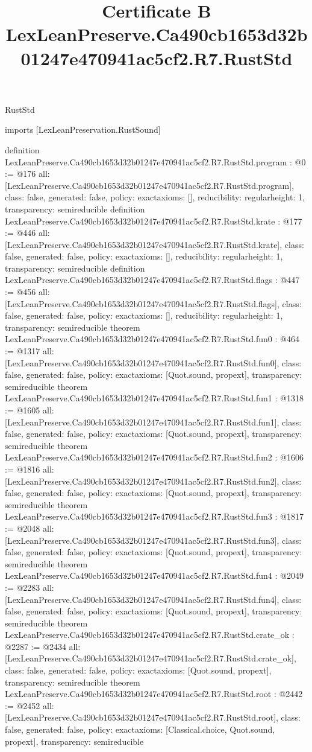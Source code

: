 \begin{lexlean}{RustStd}
\title{Certificate B LexLeanPreserve.Ca490cb1653d32b01247e470941ac5cf2.R7.RustStd}
\begin{coremodule}
imports [LexLeanPreservation.RustSound]

definition LexLeanPreserve.Ca490cb1653d32b01247e470941ac5cf2.R7.RustStd.program : @0 := @176 {
  all: [LexLeanPreserve.Ca490cb1653d32b01247e470941ac5cf2.R7.RustStd.program],
  class: false,
  generated: false,
  policy: exact{axioms: []},
  reducibility: regular{height: 1},
  transparency: semireducible
}
definition LexLeanPreserve.Ca490cb1653d32b01247e470941ac5cf2.R7.RustStd.krate : @177 := @446 {
  all: [LexLeanPreserve.Ca490cb1653d32b01247e470941ac5cf2.R7.RustStd.krate],
  class: false,
  generated: false,
  policy: exact{axioms: []},
  reducibility: regular{height: 1},
  transparency: semireducible
}
definition LexLeanPreserve.Ca490cb1653d32b01247e470941ac5cf2.R7.RustStd.flags : @447 := @456 {
  all: [LexLeanPreserve.Ca490cb1653d32b01247e470941ac5cf2.R7.RustStd.flags],
  class: false,
  generated: false,
  policy: exact{axioms: []},
  reducibility: regular{height: 1},
  transparency: semireducible
}
theorem LexLeanPreserve.Ca490cb1653d32b01247e470941ac5cf2.R7.RustStd.fun0 : @464 := @1317 {
  all: [LexLeanPreserve.Ca490cb1653d32b01247e470941ac5cf2.R7.RustStd.fun0],
  class: false,
  generated: false,
  policy: exact{axioms: [Quot.sound, propext]},
  transparency: semireducible
}
theorem LexLeanPreserve.Ca490cb1653d32b01247e470941ac5cf2.R7.RustStd.fun1 : @1318 := @1605 {
  all: [LexLeanPreserve.Ca490cb1653d32b01247e470941ac5cf2.R7.RustStd.fun1],
  class: false,
  generated: false,
  policy: exact{axioms: [Quot.sound, propext]},
  transparency: semireducible
}
theorem LexLeanPreserve.Ca490cb1653d32b01247e470941ac5cf2.R7.RustStd.fun2 : @1606 := @1816 {
  all: [LexLeanPreserve.Ca490cb1653d32b01247e470941ac5cf2.R7.RustStd.fun2],
  class: false,
  generated: false,
  policy: exact{axioms: [Quot.sound, propext]},
  transparency: semireducible
}
theorem LexLeanPreserve.Ca490cb1653d32b01247e470941ac5cf2.R7.RustStd.fun3 : @1817 := @2048 {
  all: [LexLeanPreserve.Ca490cb1653d32b01247e470941ac5cf2.R7.RustStd.fun3],
  class: false,
  generated: false,
  policy: exact{axioms: [Quot.sound, propext]},
  transparency: semireducible
}
theorem LexLeanPreserve.Ca490cb1653d32b01247e470941ac5cf2.R7.RustStd.fun4 : @2049 := @2283 {
  all: [LexLeanPreserve.Ca490cb1653d32b01247e470941ac5cf2.R7.RustStd.fun4],
  class: false,
  generated: false,
  policy: exact{axioms: [Quot.sound, propext]},
  transparency: semireducible
}
theorem LexLeanPreserve.Ca490cb1653d32b01247e470941ac5cf2.R7.RustStd.crate_ok : @2287 := @2434 {
  all: [LexLeanPreserve.Ca490cb1653d32b01247e470941ac5cf2.R7.RustStd.crate_ok],
  class: false,
  generated: false,
  policy: exact{axioms: [Quot.sound, propext]},
  transparency: semireducible
}
theorem LexLeanPreserve.Ca490cb1653d32b01247e470941ac5cf2.R7.RustStd.root : @2442 := @2452 {
  all: [LexLeanPreserve.Ca490cb1653d32b01247e470941ac5cf2.R7.RustStd.root],
  class: false,
  generated: false,
  policy: exact{axioms: [Classical.choice, Quot.sound, propext]},
  transparency: semireducible
}


\end{coremodule}
\end{lexlean}
